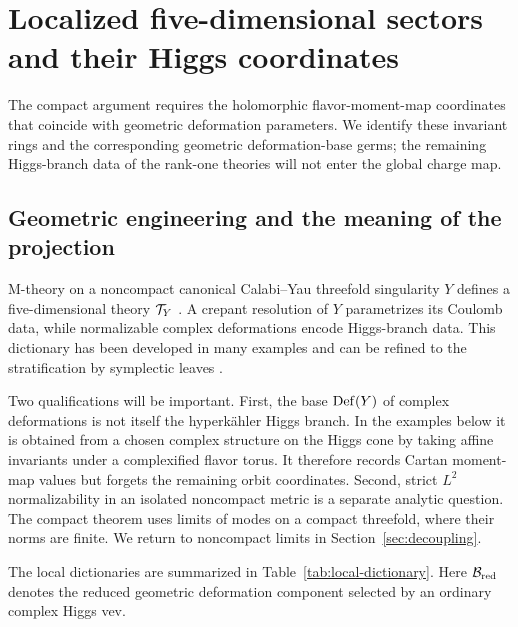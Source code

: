 \section{Localized five-dimensional sectors and their Higgs coordinates}
\label{sec:local-sectors}

The compact argument requires the holomorphic flavor-moment-map coordinates
that coincide with geometric deformation parameters. We identify these
invariant rings and the corresponding geometric deformation-base germs;
the remaining Higgs-branch data of the
rank-one theories will not enter the global charge map.

\subsection{Geometric engineering and the meaning of the projection}
\label{subsec:local-conventions}

M-theory on a noncompact canonical Calabi--Yau threefold singularity $Y$
defines a five-dimensional theory $\mathcal T_Y$
\cite{Seiberg:1996,Douglas:1996,Intriligator:1997}. A crepant resolution of $Y$
parametrizes its Coulomb data, while normalizable complex deformations encode
Higgs-branch data. This dictionary has been developed in many examples and
can be refined to the stratification by symplectic leaves
\cite{Closset:2020afy,DeMarco:2026higgs}.

Two qualifications will be important. First, the base $\operatorname{Def}(Y)$ of complex
deformations is not itself the hyperk\"ahler Higgs branch. In the examples
below it is obtained from a chosen complex structure on the Higgs cone by
taking affine invariants under a complexified flavor torus. It therefore
records Cartan moment-map values but forgets the remaining orbit coordinates.
Second, strict $L^2$ normalizability in an isolated noncompact metric is a
separate analytic question. The compact theorem uses limits of modes on a
compact threefold, where their norms are finite. We return to noncompact
limits in Section~\ref{sec:decoupling}.

The local dictionaries are summarized in
Table~\ref{tab:local-dictionary}. Here $\mathcal B_{\mathrm{red}}$ denotes the reduced
geometric deformation component selected by an ordinary complex Higgs vev.

